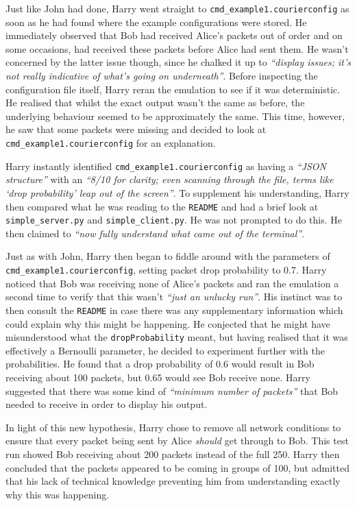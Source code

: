 Just like John had done, Harry went straight to \texttt{cmd\_example1.courierconfig} as soon as he had found where
the example configurations were stored. He immediately observed that Bob had received Alice's packets out of order
and on some occasions, had received these packets before Alice had sent them. He wasn't concerned by the latter issue
though, since he chalked it up to \emph{``display issues; it's not really indicative of what's going on
underneath''}. Before inspecting the configuration file itself, Harry reran the emulation to see if it was
deterministic. He realised that whilst the exact output wasn't the same as before, the underlying behaviour seemed to
be approximately the same. This time, however, he saw that some packets were missing and decided to look at
\texttt{cmd\_example1.courierconfig} for an explanation.

Harry instantly identified \texttt{cmd\_example1.courierconfig} as having a \emph{``JSON structure''} with an
\emph{``8/10 for clarity; even scanning through the file, terms like `drop probability' leap out of the screen''}. To
supplement his understanding, Harry then compared what he was reading to the \texttt{README} and had a brief look at
\texttt{simple\_server.py} and \texttt{simple\_client.py}. He was not prompted to do this. He then claimed to
\emph{``now fully understand what came out of the terminal''}.

Just as with John, Harry then began to fiddle around with the parameters of \texttt{cmd\_example1.courierconfig},
setting packet drop probability to 0.7. Harry noticed that Bob was receiving none of Alice's packets and ran the
emulation a second time to verify that this wasn't \emph{``just an unlucky run''}. His instinct was to then consult
the \texttt{README} in case there was any supplementary information which could explain why this might be happening.
He conjected that he might have misunderstood what the \texttt{dropProbability} meant, but having realised that it was
effectively a Bernoulli parameter, he decided to experiment further with the probabilities. He found that a drop
probability of 0.6 would result in Bob receiving about 100 packets, but 0.65 would see Bob receive none. Harry
suggested that there was some kind of \emph{``minimum number of packets''} that Bob needed to receive in order to
display his output.

In light of this new hypothesis, Harry chose to remove all network conditions to ensure that every packet being sent
by Alice \emph{should} get through to Bob. This test run showed Bob receiving about 200 packets instead of the full
250. Harry then concluded that the packets appeared to be coming in groups of 100, but admitted that his lack
of technical knowledge preventing him from understanding exactly why this was happening.

